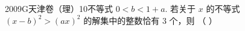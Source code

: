 
\begin{problem}{2009}{G}{天津卷（理）}{10}{不等式}
$0<b<1+a$. 若关于 $x$ 的不等式 $(x-b)^2>(ax)^2$ 的解集中的整数恰有 $3$ 个，则 \hspace{1cm} （ ）
\begin{choices}
\end{choices}
\end{problem}

\begin{answer}

\end{answer}

\begin{solutions}

\end{solutions}